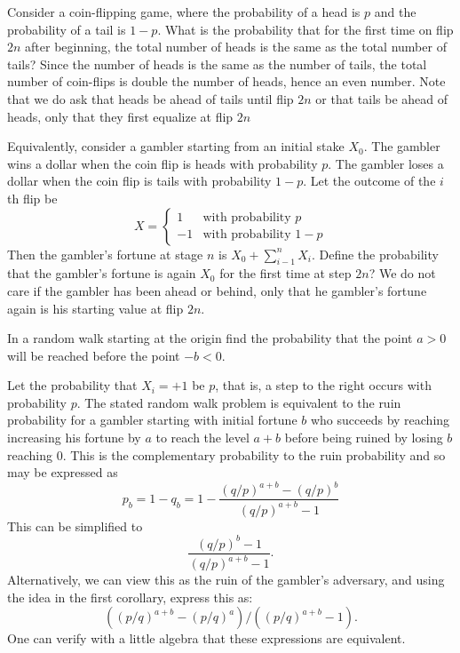 \begin{problem}
   Consider a coin-flipping game, where the probability of a head is
  $p$ and the probability of a tail is $1-p$.  What is the probability
  that for the first time on flip $2n$ after beginning, the total number of
  heads is the same as the total number of tails?  Since the number of
  heads is the same as the number of tails, the total number of coin-flips
  is double the number of heads, hence an even number.  Note that we
  do ask that heads be ahead of tails until flip $2n$ or that tails be
  ahead of heads, only that they first equalize at flip $2n$

  Equivalently, consider a gambler starting from an initial stake $X_0$.
  The gambler wins a dollar when the coin flip is heads with
  probability $p$.  The gambler loses a dollar when the coin flip is
  tails with probability $1-p$. Let the outcome of the $i$th flip be
  \[
      X =
      \begin{cases}
	1  &  \text{with probability $p$} \\
        -1 &  \text{with probability $1-p$}
      \end{cases}
   \]
   Then the gambler's fortune at stage $n$ is $X_0 + \sum_{i-1}^n
   X_i.$ Define the probability that the gambler's fortune is again $X_0$
   for the first time at step $2n$?  We do not care if the gambler has been
   ahead or behind, only that he gambler's fortune again is his starting value
   at flip $2n$.

\begin{sol}

\end{sol}
\end{problem}

\begin{problem}
 In a random walk starting at the origin find the probability
    that the point $a > 0$ will be reached before the point $-b < 0$.

\begin{sol}

Let the probability that $X_i = +1$ be $p$, that is, a step to the
right occurs with probability $p$.
The stated random walk problem is equivalent to the
ruin probability for a gambler starting
with initial fortune $b$ who succeeds by reaching increasing
his fortune by $a$ to reach the level
$a + b$ before being ruined by losing $b$ reaching 0.  This is the
complementary probability to the ruin probability and so may
be expressed as
\[
  p_b = 1 - q_b
      = 1 - \frac{ (q/p)^{a+b} - (q/p)^{b}}{(q/p)^{a+b} - 1}
\]
This can be simplified to
\[
   \frac{ (q/p)^b - 1}{ (q/p)^{a+b} - 1}.
\]
Alternatively, we can view this as the ruin of the gambler's
adversary, and using the idea in the first corollary, express
this as:
\[
( (p/q)^{a+b} - (p/q)^{a} )/( (p/q)^{a+b} - 1 ).
\]
One can verify with a little algebra that these expressions
are equivalent.
\end{sol}
\end{problem}

